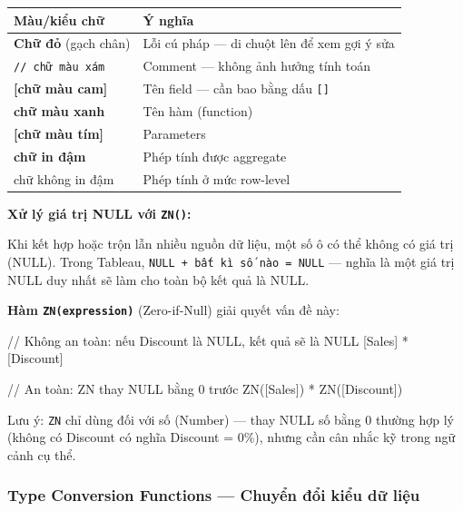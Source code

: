 \documentclass[12pt]{article}
\begin{document}
\begin{center}
\renewcommand{\arraystretch}{1.4}
\begin{tabularx}{\linewidth}{l X}
\toprule
\textbf{Màu/kiểu chữ} & \textbf{Ý nghĩa} \\
\midrule
\textbf{Chữ đỏ} (gạch chân) & Lỗi cú pháp --- di chuột lên để xem gợi ý sửa \\
\texttt{// chữ màu xám} & Comment --- không ảnh hưởng tính toán \\
\textbf{[chữ màu cam]} & Tên field --- cần bao bằng dấu \texttt{[]} \\
\textbf{chữ màu xanh} & Tên hàm (function) \\
\textbf{[chữ màu tím]} & Parameters \\
\textbf{chữ in đậm} & Phép tính được aggregate \\
chữ không in đậm & Phép tính ở mức row-level \\
\bottomrule
\end{tabularx}
\end{center}

\noindent \textbf{Xử lý giá trị NULL với \texttt{ZN()}:}

\noindent Khi kết hợp hoặc trộn lẫn nhiều nguồn dữ liệu, một số ô có thể không có giá trị (NULL). Trong Tableau, \texttt{NULL + bất kì số nào = NULL} --- nghĩa là một giá trị NULL duy nhất sẽ làm cho toàn bộ kết quả là NULL.

\noindent \textbf{Hàm \texttt{ZN(expression)}} (Zero-if-Null) giải quyết vấn đề này:

\begin{aivncodebox}[]
\begin{python}
// Không an toàn: nếu Discount là NULL, kết quả sẽ là NULL
[Sales] * [Discount]

// An toàn: ZN thay NULL bằng 0 trước
ZN([Sales]) * ZN([Discount])
\end{python}
\end{aivncodebox}

\noindent Lưu ý: \texttt{ZN} chỉ dùng đối với số (Number) --- thay NULL số bằng 0 thường hợp lý (không có Discount có nghĩa Discount = 0\%), nhưng cần cân nhắc kỹ trong ngữ cảnh cụ thể.

\subsubsection{Type Conversion Functions --- Chuyển đổi kiểu dữ liệu}
\end{document}
